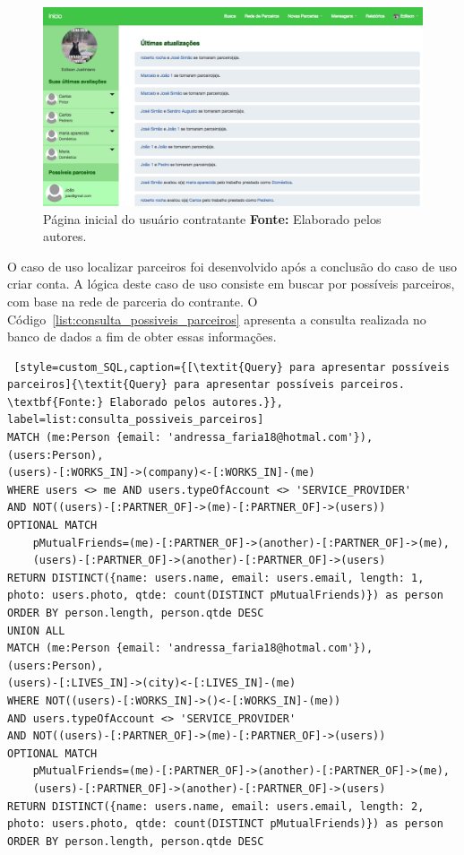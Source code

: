 \newpage
\begin{figure}[h!]
	\centerline{\includegraphics[scale=0.3]{./imagens/home-contratante.png}}
	\caption[Página inicial do usuário contratante]
	{Página inicial do usuário contratante \textbf{Fonte:} Elaborado pelos autores.}
	\label{fig:pagina_inicial_contratante}
\end{figure}


\par O caso de uso localizar parceiros foi desenvolvido após a conclusão do caso de uso criar conta. A lógica deste caso de uso consiste em buscar por possíveis parceiros, com base na rede de parceria do contrante. O Código~\ref{list:consulta_possiveis_parceiros} apresenta a consulta realizada no banco de dados a fim de obter essas informações.

\begin{lstlisting} [style=custom_SQL,caption={[\textit{Query} para apresentar possíveis parceiros]{\textit{Query} para apresentar possíveis parceiros. \textbf{Fonte:} Elaborado pelos autores.}}, label=list:consulta_possiveis_parceiros] 	
MATCH (me:Person {email: 'andressa_faria18@hotmal.com'}), (users:Person),
(users)-[:WORKS_IN]->(company)<-[:WORKS_IN]-(me)
WHERE users <> me AND users.typeOfAccount <> 'SERVICE_PROVIDER'
AND NOT((users)-[:PARTNER_OF]->(me)-[:PARTNER_OF]->(users)) 
OPTIONAL MATCH
	pMutualFriends=(me)-[:PARTNER_OF]->(another)-[:PARTNER_OF]->(me),
	(users)-[:PARTNER_OF]->(another)-[:PARTNER_OF]->(users)
RETURN DISTINCT({name: users.name, email: users.email, length: 1, 
photo: users.photo, qtde: count(DISTINCT pMutualFriends)}) as person
ORDER BY person.length, person.qtde DESC
UNION ALL
MATCH (me:Person {email: 'andressa_faria18@hotmal.com'}), (users:Person),
(users)-[:LIVES_IN]->(city)<-[:LIVES_IN]-(me)
WHERE NOT((users)-[:WORKS_IN]->()<-[:WORKS_IN]-(me))
AND users.typeOfAccount <> 'SERVICE_PROVIDER'
AND NOT((users)-[:PARTNER_OF]->(me)-[:PARTNER_OF]->(users))
OPTIONAL MATCH 
	pMutualFriends=(me)-[:PARTNER_OF]->(another)-[:PARTNER_OF]->(me),
	(users)-[:PARTNER_OF]->(another)-[:PARTNER_OF]->(users)
RETURN DISTINCT({name: users.name, email: users.email, length: 2, 
photo: users.photo, qtde: count(DISTINCT pMutualFriends)}) as person
ORDER BY person.length, person.qtde DESC
\end{lstlisting}

